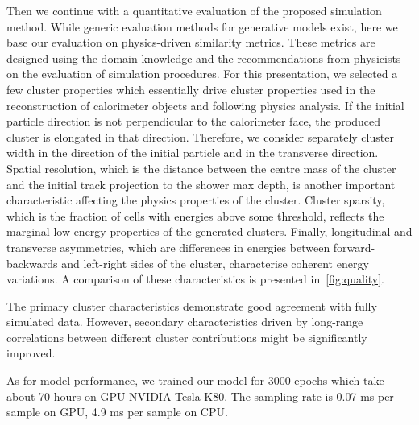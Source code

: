 Then we continue with a quantitative evaluation of the proposed simulation
method. While generic evaluation methods for generative models exist,
here we base our evaluation on physics-driven similarity
metrics. These metrics are designed using the domain knowledge and the
recommendations from physicists on the evaluation of simulation
procedures. 
For this presentation, we selected a few cluster properties which essentially
drive cluster properties used in the reconstruction of calorimeter objects
and following physics analysis. If the initial particle direction is not
perpendicular to the calorimeter face, the produced cluster is elongated
in that direction. Therefore, we consider separately cluster width in
the direction of the initial particle and in the transverse
direction. Spatial resolution, which is the distance between the centre
mass of the cluster and the initial track projection to the shower max
depth, is another important characteristic affecting the physics
properties of the cluster. Cluster sparsity, which is the fraction of
cells with energies above some threshold, reflects the marginal low
energy properties of the generated clusters. Finally, longitudinal and
transverse asymmetries, which are differences in energies between
forward-backwards and left-right sides of the cluster, characterise
coherent energy variations.  
 A comparison of these characteristics is presented in~\cref{fig:quality}. 

The primary cluster characteristics demonstrate good agreement with
fully simulated data. However, secondary characteristics driven by
long-range correlations between different cluster contributions might
be significantly improved.  




As for model performance, we trained our model for 3000 epochs which take about 70 hours on GPU NVIDIA Tesla K80. The sampling rate is 0.07 ms per sample on GPU, 4.9 ms per sample on CPU.

